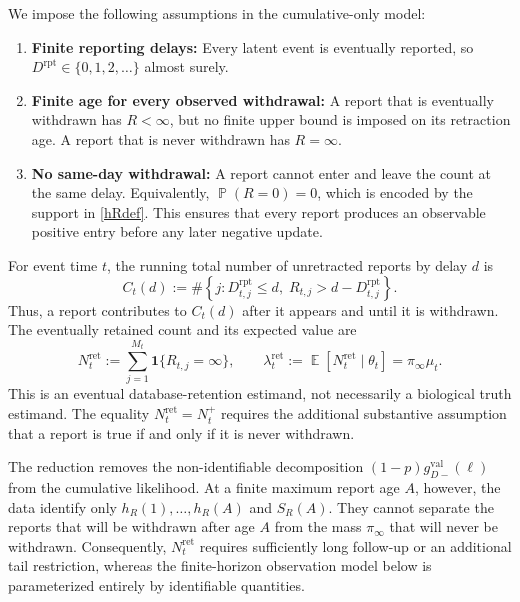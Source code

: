 \documentclass{article}
\theoremstyle{definition}
\theoremstyle{remark}
\newcommand{\E}{\operatorname{\mathbb{E}}}
\newcommand{\Prb}{\operatorname{\mathbb{P}}}
\begin{document}
We impose the following assumptions in the cumulative-only model:
\begin{enumerate}
    \item \textbf{Finite reporting delays:} Every latent event is eventually
    reported, so $D^{\mathrm{rpt}}\in\{0,1,2,\dots\}$ almost surely.
    \item \textbf{Finite age for every observed withdrawal:} A report that is
    eventually withdrawn has $R<\infty$, but no finite upper bound is imposed
    on its retraction age. A report that is never withdrawn has $R=\infty$.
    \item \textbf{No same-day withdrawal:} A report cannot enter and leave the
    count at the same delay. Equivalently, $\Prb(R=0)=0$, which is encoded by
    the support in \eqref{hRdef}. This ensures that every report produces an
    observable positive entry before any later negative update.
\end{enumerate}

For event time $t$, the running total number of unretracted reports by delay
$d$ is
\begin{equation}\label{cumdef}
    C_t(d)
    :=
    \#\left\{
    j:
    D_{t,j}^{\mathrm{rpt}}\leq d,\;
    R_{t,j}>d-D_{t,j}^{\mathrm{rpt}}
    \right\}.
\end{equation}
Thus, a report contributes to $C_t(d)$ after it appears and until it is
withdrawn. The eventually retained count and its expected value are
\begin{equation}\label{retainedcount}
    N_t^{\mathrm{ret}}
    :=
    \sum_{j=1}^{M_t}\mathbf 1\{R_{t,j}=\infty\},
    \qquad
    \lambda_t^{\mathrm{ret}}
    :=
    \E[N_t^{\mathrm{ret}}\mid\theta_t]
    =\pi_\infty\mu_t.
\end{equation}
This is an eventual database-retention estimand, not necessarily a biological
truth estimand. The equality $N_t^{\mathrm{ret}}=N_t^+$ requires the additional
substantive assumption that a report is true if and only if it is never
withdrawn.

The reduction removes the non-identifiable decomposition
$(1-p)g_{D-}^{\mathrm{val}}(\ell)$ from the cumulative likelihood. At a finite
maximum report age $A$, however, the data identify only
$h_R(1),\dots,h_R(A)$ and $S_R(A)$. They cannot separate the reports that will
be withdrawn after age $A$ from the mass $\pi_\infty$ that will never be
withdrawn. Consequently, $N_t^{\mathrm{ret}}$ requires sufficiently long
follow-up or an additional tail restriction, whereas the finite-horizon
observation model below is parameterized entirely by identifiable quantities.
\end{document}

